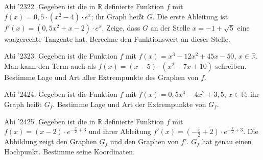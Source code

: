 \documentclass[11pt]{article}
\begin{document}
\pfgruppe{}
\begin{pfaufg}{Abi ’23}{22.}{}
Gegeben ist die in $\mathbb{R}$ definierte Funktion $f$ mit $f(x) = 0{,}5\cdot(x^2 - 4)\cdot e^x$; ihr Graph heißt $G$. Die erste Ableitung ist $f'(x) = (0{,}5x^2 + x - 2)\cdot e^x$. Zeige, dass $G$ an der Stelle $x = -1 + \sqrt{5}$ eine waagerechte Tangente hat. Berechne den Funktionswert an dieser Stelle.
\end{pfaufg}
\pfgruppe{}
\begin{pfaufg}{Abi ’23}{23.}{}
Gegeben ist die Funktion $f$ mit $f(x) = x^3 - 12x^2 + 45x - 50$, $x \in \mathbb{R}$. Man kann den Term auch als $f(x) = (x - 5)\cdot(x^2 - 7x + 10)$ schreiben. Bestimme Lage und Art aller Extrempunkte des Graphen von $f$.
\end{pfaufg}
\pfgruppe{}
\begin{pfaufg}{Abi ’24}{24.}{}
Gegeben ist die Funktion $f$ mit $f(x) = 0{,}5x^4 - 4x^2 + 3{,}5$, $x \in \mathbb{R}$; ihr Graph heißt $G_f$. Bestimme Lage und Art der Extrempunkte von $G_f$.
\end{pfaufg}
\pfgruppe{}
\begin{pfaufg}{Abi ’24}{25.}{}
Gegeben ist die in $\mathbb{R}$ definierte Funktion $f$ mit $f(x) = (x - 2)\cdot e^{-\tfrac{x}{2} + 3}$ und ihrer Ableitung $f'(x) = \left(-\tfrac{x}{2} + 2\right)\cdot e^{-\tfrac{x}{2} + 3}$. Die Abbildung zeigt den Graphen $G_f$ und den Graphen von $f'$. $G_f$ hat genau einen Hochpunkt. Bestimme seine Koordinaten.
\par\smallskip\noindent {}\par
{}
\end{pfaufg}
\end{document}
